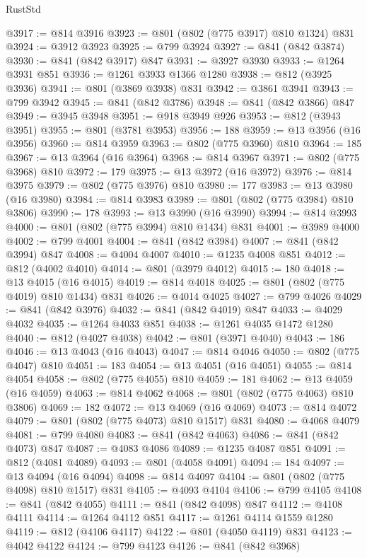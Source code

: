 \begin{lexlean}{RustStd}
\begin{coremodule}
@3917 := @814 @3916
@3923 := @801 (@802 (@775 @3917) @810 @1324) @831
@3924 := @3912 @3923
@3925 := @799 @3924
@3927 := @841 (@842 @3874)
@3930 := @841 (@842 @3917) @847
@3931 := @3927 @3930
@3933 := @1264 @3931 @851
@3936 := @1261 @3933 @1366 @1280
@3938 := @812 (@3925 @3936)
@3941 := @801 (@3869 @3938) @831
@3942 := @3861 @3941
@3943 := @799 @3942
@3945 := @841 (@842 @3786)
@3948 := @841 (@842 @3866) @847
@3949 := @3945 @3948
@3951 := @918 @3949 @926
@3953 := @812 (@3943 @3951)
@3955 := @801 (@3781 @3953)
@3956 := 188
@3959 := @13 @3956 (@16 @3956)
@3960 := @814 @3959
@3963 := @802 (@775 @3960) @810
@3964 := 185
@3967 := @13 @3964 (@16 @3964)
@3968 := @814 @3967
@3971 := @802 (@775 @3968) @810
@3972 := 179
@3975 := @13 @3972 (@16 @3972)
@3976 := @814 @3975
@3979 := @802 (@775 @3976) @810
@3980 := 177
@3983 := @13 @3980 (@16 @3980)
@3984 := @814 @3983
@3989 := @801 (@802 (@775 @3984) @810 @3806)
@3990 := 178
@3993 := @13 @3990 (@16 @3990)
@3994 := @814 @3993
@4000 := @801 (@802 (@775 @3994) @810 @1434) @831
@4001 := @3989 @4000
@4002 := @799 @4001
@4004 := @841 (@842 @3984)
@4007 := @841 (@842 @3994) @847
@4008 := @4004 @4007
@4010 := @1235 @4008 @851
@4012 := @812 (@4002 @4010)
@4014 := @801 (@3979 @4012)
@4015 := 180
@4018 := @13 @4015 (@16 @4015)
@4019 := @814 @4018
@4025 := @801 (@802 (@775 @4019) @810 @1434) @831
@4026 := @4014 @4025
@4027 := @799 @4026
@4029 := @841 (@842 @3976)
@4032 := @841 (@842 @4019) @847
@4033 := @4029 @4032
@4035 := @1264 @4033 @851
@4038 := @1261 @4035 @1472 @1280
@4040 := @812 (@4027 @4038)
@4042 := @801 (@3971 @4040)
@4043 := 186
@4046 := @13 @4043 (@16 @4043)
@4047 := @814 @4046
@4050 := @802 (@775 @4047) @810
@4051 := 183
@4054 := @13 @4051 (@16 @4051)
@4055 := @814 @4054
@4058 := @802 (@775 @4055) @810
@4059 := 181
@4062 := @13 @4059 (@16 @4059)
@4063 := @814 @4062
@4068 := @801 (@802 (@775 @4063) @810 @3806)
@4069 := 182
@4072 := @13 @4069 (@16 @4069)
@4073 := @814 @4072
@4079 := @801 (@802 (@775 @4073) @810 @1517) @831
@4080 := @4068 @4079
@4081 := @799 @4080
@4083 := @841 (@842 @4063)
@4086 := @841 (@842 @4073) @847
@4087 := @4083 @4086
@4089 := @1235 @4087 @851
@4091 := @812 (@4081 @4089)
@4093 := @801 (@4058 @4091)
@4094 := 184
@4097 := @13 @4094 (@16 @4094)
@4098 := @814 @4097
@4104 := @801 (@802 (@775 @4098) @810 @1517) @831
@4105 := @4093 @4104
@4106 := @799 @4105
@4108 := @841 (@842 @4055)
@4111 := @841 (@842 @4098) @847
@4112 := @4108 @4111
@4114 := @1264 @4112 @851
@4117 := @1261 @4114 @1559 @1280
@4119 := @812 (@4106 @4117)
@4122 := @801 (@4050 @4119) @831
@4123 := @4042 @4122
@4124 := @799 @4123
@4126 := @841 (@842 @3968)

\end{coremodule}
\end{lexlean}
